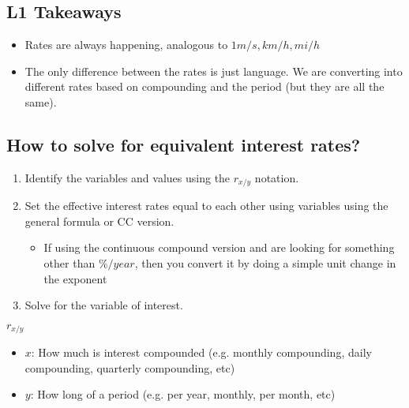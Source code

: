 
\subsection{L1 Takeaways}

\begin{intuition}
    \begin{itemize}
        \item Rates are always happening, analogous to $1m/s,km/h,mi/h$
        \item The only difference between the rates is just language. We are converting into different rates based on compounding and the period (but they are all the same).
    \end{itemize}
\end{intuition}

\subsection{How to solve for equivalent interest rates?}
\begin{process}
    \begin{enumerate}
        \item Identify the variables and values using the $r_{x/y}$ notation. 
        \item Set the effective interest rates equal to each other using variables using the general formula or CC version.
        \begin{itemize}
            \item If using the continuous compound version and are looking for something other than $\%/year$, then you convert it by doing a simple unit change in the exponent
        \end{itemize}
        \item Solve for the variable of interest. 
    \end{enumerate}
\end{process}

\begin{intuition}
    $r_{x/y}$
    \begin{itemize}
        \item $x$: How much is interest compounded (e.g. monthly compounding, daily compounding, quarterly compounding, etc)
        \item $y$: How long of a period (e.g. per year, monthly, per month, etc)
    \end{itemize}
\end{intuition}

